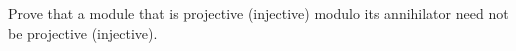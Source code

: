 Prove that a module that is projective (injective) modulo its annihilator need not be projective (injective).
